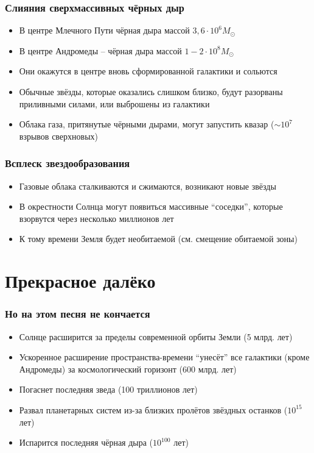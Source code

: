\documentclass[aspectratio=169]{beamer}
\begin{document}
\begin{frame}
\frametitle{Слияния сверхмассивных чёрных дыр}
\begin{itemize}
\item В центре Млечного Пути чёрная дыра массой $3,6 \cdot 10^6 M_\odot$
\item В центре Андромеды -- чёрная дыра массой $1 - 2 \cdot 10^8 M_\odot$
\item Они окажутся в центре вновь сформированной галактики и сольются
\item Обычные звёзды, которые оказались слишком близко, будут разорваны приливными силами, или выброшены из галактики
\item Облака газа, притянутые чёрными дырами, могут запустить квазар ($\sim 10^7$ взрывов сверхновых)
\end{itemize}
\end{frame}

\begin{frame}
\frametitle{Всплеск звездообразования}
\begin{itemize}
\item Газовые облака сталкиваются и сжимаются, возникают новые звёзды
\item В окрестности Солнца могут появиться массивные ``соседки'', которые взорвутся через несколько миллионов лет
\item К тому времени Земля будет необитаемой (см. смещение обитаемой зоны)
\end{itemize}
\end{frame}

\section{Прекрасное далёко}
\begin{frame}
\frametitle{Но на этом песня не кончается}
\begin{itemize}
\item Солнце расширится за пределы современной орбиты Земли (5 млрд. лет)
\item Ускоренное расширение пространства-времени ``унесёт'' все галактики (кроме Андромеды) за космологический горизонт (600 млрд. лет)
\item Погаснет последняя зведа (100 триллионов лет)
\item Развал планетарных систем из-за близких пролётов звёздных останков ($10^{15}$ лет)
\item Испарится последняя чёрная дыра ($10^{100}$ лет)
\end{itemize}
\end{frame}
\end{document}
